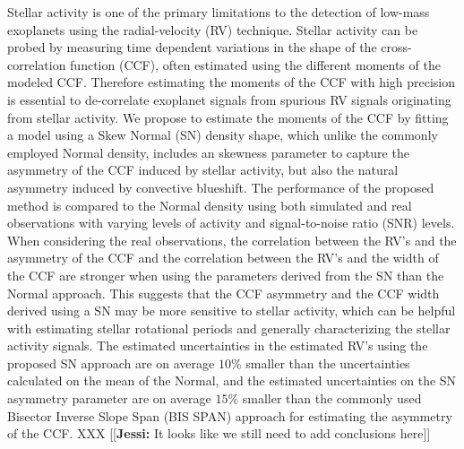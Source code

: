 \documentclass{aa}
\newcommand{\jessi}[1]{{\color{Purple}[[\textbf{Jessi: }#1]]}}
\begin{document}
\abstract
{Stellar activity is one of the primary limitations to the detection of low-mass exoplanets using the radial-velocity (RV) technique. 
Stellar activity can be probed by measuring time dependent variations in the shape of the cross-correlation function (CCF), often estimated using the different moments of the modeled CCF. Therefore estimating the moments of the CCF with high precision is essential to de-correlate exoplanet signals from spurious RV signals originating from stellar activity.}
%
{We propose to estimate the moments of the CCF by fitting a model using a Skew Normal (SN) density shape, which unlike the commonly employed Normal density, includes an skewness parameter to capture the asymmetry of the CCF induced by stellar activity, but also the natural asymmetry induced by convective blueshift.}
%
{The performance of the proposed method is compared to the Normal density using both simulated and real observations with varying levels of activity and signal-to-noise ratio (SNR) levels.}
%
{When considering the real observations, the correlation between the RV's and the asymmetry of the CCF and the correlation between the RV's and the width of the CCF are stronger when using the parameters derived from the SN than the Normal approach. 
This suggests that the CCF asymmetry and the CCF width derived using a SN may be more sensitive to stellar activity, which can be helpful with estimating stellar rotational periods and generally characterizing the stellar activity signals.
The estimated uncertainties in the estimated RV's using the proposed SN approach are on average $10\%$ smaller than the uncertainties calculated on the mean of the Normal, and the estimated uncertainties on the SN asymmetry parameter are on average $15\%$ smaller than the commonly used Bisector Inverse Slope Span (BIS SPAN) approach for estimating the asymmetry of the CCF. }
{XXX \jessi{It looks like we still need to add conclusions here}}
%
\end{document}
